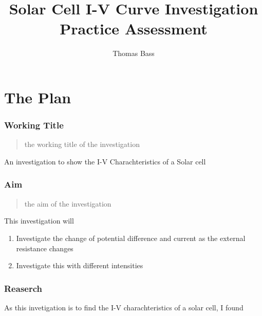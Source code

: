 \documentclass{article}
\title{Solar Cell I-V Curve Investigation \\ Practice Assessment}
\author{Thomas Bass}
\begin{document}
\maketitle


\part{The Plan}

\section{Working Title}
\begin{quote}
the working title of the investigation
\end{quote}
An investigation to show the I-V Charachteristics of a Solar cell

\section{Aim}
\begin{quote}
the aim of the investigation
\end{quote}
This investigation will
\begin{enumerate}
  \item Investigate the change of potential difference and current as the external resistance changes
  \item Investigate this with different intensities
\end{enumerate}

\section{Reaserch}
As this invetigation is to find the I-V charachteristics of a solar cell, I found
\end{document}
